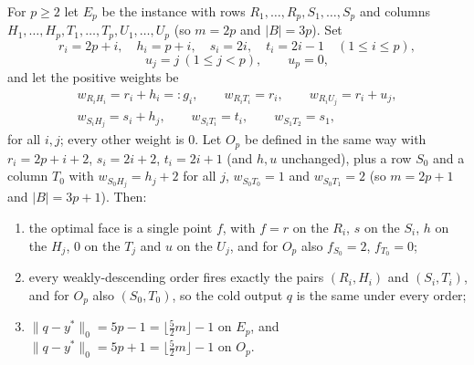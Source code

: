 \begin{proposition}\label{prop:coldfamilies}
For $p \ge 2$ let $E_p$ be the instance with rows $R_1,\dots,R_p,S_1,\dots,S_p$ and columns
$H_1,\dots,H_p,T_1,\dots,T_p,U_1,\dots,U_p$ (so $m = 2p$ and $|B| = 3p$). Set
\[
  r_i = 2p+i,\quad h_i = p+i,\quad s_i = 2i,\quad t_i = 2i-1 \quad (1 \le i \le p),
\]
\[
  u_j = j \ (1 \le j < p),\qquad u_p = 0,
\]
and let the positive weights be
\begin{gather*}
  w_{R_iH_i} = r_i+h_i =: g_i,\qquad w_{R_iT_i} = r_i,\qquad w_{R_iU_j} = r_i+u_j,\\
  w_{S_iH_j} = s_i+h_j,\qquad w_{S_iT_i} = t_i,\qquad w_{S_1T_2} = s_1,
\end{gather*}
for all $i, j$; every other weight is $0$. Let $O_p$ be defined in the same way with
$r_i = 2p+i+2$, $s_i = 2i+2$, $t_i = 2i+1$ (and $h, u$ unchanged), plus a row $S_0$ and a column
$T_0$ with $w_{S_0H_j} = h_j+2$ for all $j$, $w_{S_0T_0} = 1$ and $w_{S_0T_1} = 2$ (so
$m = 2p+1$ and $|B| = 3p+1$). Then:
\begin{enumerate}
\item[(a)] the optimal face is a single point $f$, with $f = r$ on the $R_i$, $s$ on the $S_i$,
  $h$ on the $H_j$, $0$ on the $T_j$ and $u$ on the $U_j$, and for $O_p$ also $f_{S_0} = 2$,
  $f_{T_0} = 0$;
\item[(b)] every weakly-descending order fires exactly the pairs $(R_i,H_i)$ and $(S_i,T_i)$, and
  for $O_p$ also $(S_0,T_0)$, so the cold output $q$ is the same under every order;
\item[(c)] $\|q-y^*\|_0 = 5p-1 = \lfloor \tfrac52 m \rfloor - 1$ on $E_p$, and
  $\|q-y^*\|_0 = 5p+1 = \lfloor \tfrac52 m \rfloor - 1$ on $O_p$.
\end{enumerate}
\end{proposition}

